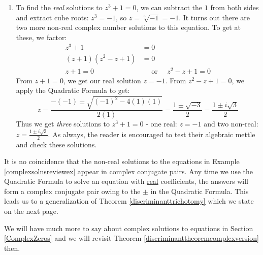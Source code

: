 {\begin{enumerate}
\item To find  the \textit{real} solutions to  $z^3 + 1 = 0$, we can subtract the $1$ from both sides and extract cube roots: $z^3 = -1$, so $z  = \sqrt[3]{-1} = -1$.  It turns out there are two more non-real complex number solutions to this equation.  To get at these, we factor:
\begin{align*}
z ^ 3 + 1 & =  0  \\
(z + 1)(z^2 - z + 1) & =  0  \tag*{Factor (Sum of Two Cubes)} \\
z + 1 = 0 & \quad \text{ or } \quad  z^2 - z + 1 = 0
\end{align*}
From $z+1 = 0$, we get our real solution $z = -1$.  From $z^2 -z + 1 = 0$, we apply the Quadratic Formula to get: 
\[
z = \dfrac{-(-1) \pm \sqrt{(-1)^2 - 4(1)(1)}}{2(1)} = \dfrac{1 \pm \sqrt{-3}}{2} = \dfrac{1 \pm i\sqrt{3}}{2} 
\]
Thus we get \textit{three} solutions to $z^3 + 1 = 0$ - one real: $z = -1$ and two non-real: $z =  \frac{1 \pm i\sqrt{3}}{2}$.  As always, the reader is encouraged to test their algebraic mettle and check these solutions. 
		
\end{enumerate}
}

\medskip

It is no coincidence that the non-real solutions to the equations in Example \ref{complexsolnsreviewex} appear in  complex conjugate pairs. Any time we use the Quadratic Formula to solve an equation with \underline{real} coefficients, the answers will form a  complex conjugate pair owing to the $\pm$ in the Quadratic Formula.  This leads us to a generalization of Theorem \ref{discriminanttrichotomy} which we state on the next page.


\medskip

We will have much more to say about complex solutions to equations in Section \ref{ComplexZeros} and we will revisit Theorem \ref{discriminanttheoremcomplexversion} then.


